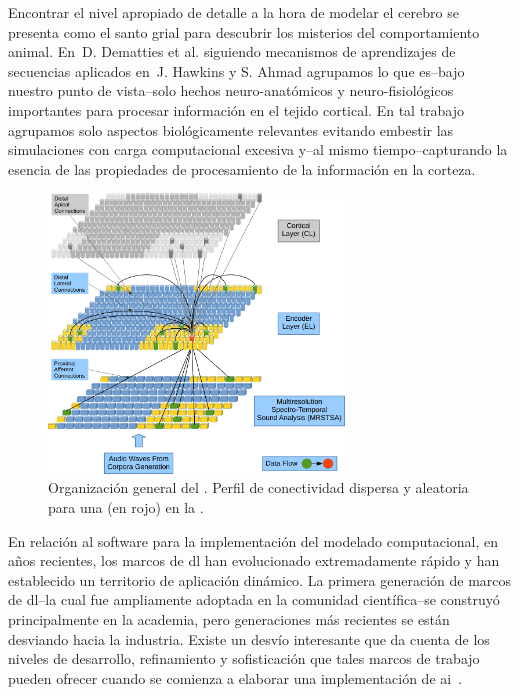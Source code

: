 {Encontrar el nivel apropiado de detalle a la hora de modelar el cerebro se presenta como el santo grial para descubrir los misterios del comportamiento animal.
En~D. Dematties et al. \cite{10.1371/journal.pone.0217966} siguiendo mecanismos de aprendizajes de secuencias aplicados en~J. Hawkins y S. Ahmad \cite{10.3389/fncir.2016.00023} agrupamos lo que es--bajo nuestro punto de vista--solo hechos neuro-anatómicos y neuro-fisiológicos importantes para procesar información en el tejido cortical.
En tal trabajo agrupamos solo aspectos biológicamente relevantes evitando embestir las simulaciones con carga computacional excesiva y--al mismo tiempo--capturando la esencia de las propiedades de procesamiento de la información en la corteza.

\begin{figure}[ht]
    \centering
    \includegraphics[width=0.7\textwidth]{EncoderColumnConnections1.png}
    \caption{Organización general del . Perfil de conectividad dispersa y aleatoria para una  (en rojo) en la .}
    \label{fig:EncoderColumnConnections1}
\end{figure}

En relación al software para la implementación del modelado computacional, en años recientes, los marcos de \gls{dl} han evolucionado extremadamente rápido y han establecido un territorio de aplicación dinámico.
La primera generación de marcos de \gls{dl}--la cual fue ampliamente adoptada en la comunidad científica--se construyó principalmente en la academia, pero generaciones más recientes se están desviando hacia la industria.
Existe un desvío interesante que da cuenta de los niveles de desarrollo, refinamiento y sofisticación que tales marcos de trabajo pueden ofrecer cuando se comienza a elaborar una implementación de \gls{ai}~\cite{Bahrampour2015ComparativeSO,7979887}.

}
